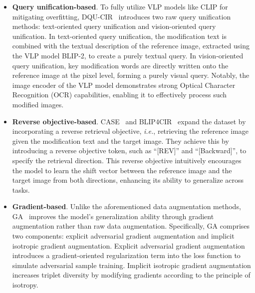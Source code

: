 \begin{itemize}
    \item \textbf{Query unification-based}. To fully utilize VLP models like CLIP for mitigating overfitting, DQU-CIR~\cite{wen2024dqu} introduces two raw query unification methods: text-oriented query unification and vision-oriented query unification. In text-oriented query unification, the modification text is combined with the textual description of the reference image, extracted using the VLP model BLIP-2, to create a purely textual query. In vision-oriented query unification, key modification words are directly written onto the reference image at the pixel level, forming a purely visual query. Notably, the image encoder of the VLP model demonstrates strong Optical Character Recognition (OCR) capabilities, enabling it to effectively process such modified images.
    \item \textbf{Reverse objective-based}. CASE~\cite{levy2024case} and BLIP4CIR~\cite{liu2024blip4cir} expand the dataset by incorporating a reverse retrieval objective, \textit{i.e.}, retrieving the reference image given the modification text and the target image. They achieve this by introducing a reverse objective token, such as ``[REV]'' and ``[Backward]'', to specify the retrieval direction. This reverse objective intuitively encourages the model to learn the shift vector between the reference image and the target image from both directions, enhancing its ability to generalize across tasks.
    \item  \textbf{Gradient-based}. Unlike the aforementioned data augmentation methods, GA~\cite{huang2022ga} improves the model's generalization ability through gradient augmentation rather than raw data augmentation. Specifically, GA comprises two components: explicit adversarial gradient augmentation and implicit isotropic gradient augmentation. Explicit adversarial gradient augmentation introduces a gradient-oriented regularization term into the loss function to simulate adversarial sample training. Implicit isotropic gradient augmentation increases triplet diversity by modifying gradients according to the principle of isotropy.
\end{itemize}


